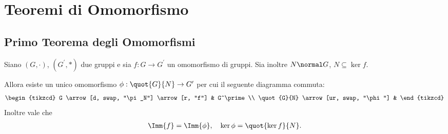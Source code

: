 \section{Teoremi di Omomorfismo}

\subsection{Primo Teorema degli Omomorfismi}
\begin{theorem}
     \label{th:first_iso}
    Siano $(G, \cdot)$, $(G^\prime, *)$ due gruppi e sia $f : G \to G^\prime$ un omomorfismo di gruppi. Sia inoltre $N \normal G$, $N \subseteq \ker f$.

    Allora esiste un unico omomorfismo $\phi : \quot{G}{N} \to G^\prime$ per cui il seguente diagramma commuta:
    \begin{equation}
        \begin{tikzcd}
            G \arrow[d, swap, "\pi_N"] \arrow[r, "f"] & G^\prime \\
            \quot{G}{N} \arrow[ur, swap, "\phi"] &
        \end{tikzcd}
    \end{equation}
    Inoltre vale che \begin{align*}
        \Imm{f} = \Imm{\phi}, \quad \ker \phi = \quot{\ker f}{N}.
    \end{align*}
\end{theorem}
